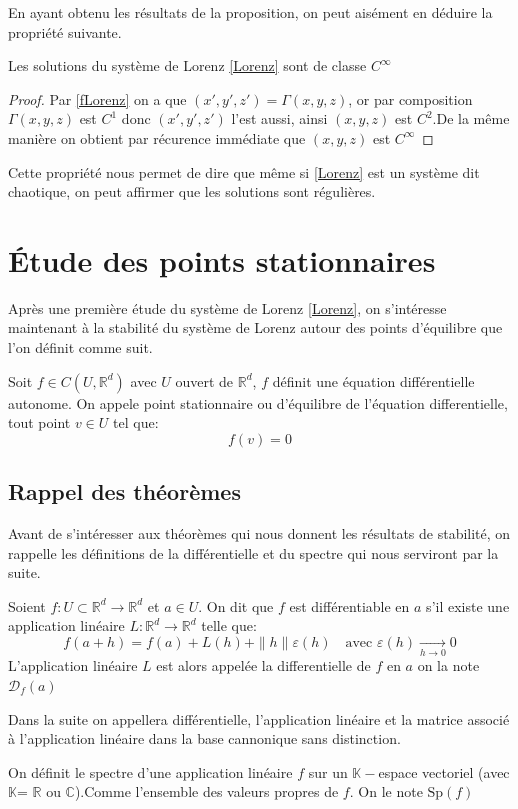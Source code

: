 \documentclass{article}
\newcommand{\R}{\mathbb{R}}
\newtheorem[M , nocut]{prop}{Proposition}[section]
\newtheorem[M , nocut]{definition}{Définition}
\newtheorem[M , nocut]{lemme}{Lemme}
\newtheorem[L , nocut]{thm}{Théoreme}
\newtheorem[M , nocut]{cor}{Corollaire}
\begin{document}
En ayant obtenu les résultats de la proposition, on peut aisément en déduire la propriété suivante.

\begin{cor}
    Les solutions du système de Lorenz \eqref{Lorenz} sont de classe $C^\infty$
\end{cor}

\begin{proof}
    Par \eqref{fLorenz} on a que $(x',y',z') = \Gamma(x,y,z)$, or par composition $\Gamma(x,y,z)$ est $C^1$ donc $(x',y',z')$ l'est aussi, ainsi $(x,y,z)$ est $C^2$.De la même manière on obtient par récurence immédiate que $(x,y,z)$ est $C^\infty$
\end{proof}

Cette propriété nous permet de dire que même si \eqref{Lorenz} est un système dit chaotique, on peut affirmer que les solutions sont régulières.

\newpage
\section{\'Etude des points stationnaires}

Après une première étude du système de Lorenz \eqref{Lorenz}, on s'intéresse maintenant à la stabilité du système de Lorenz autour des points d'équilibre que l'on définit comme suit.

\begin{definition}
    Soit $f\in C(U,\R^d)$ avec $U$ ouvert de $\R^d$, $f$ définit une équation différentielle autonome.
    On appele point stationnaire ou d'équilibre de l'équation differentielle, tout point $v \in U$ tel que:
    $$ f(v) = 0$$ 
\end{definition}

\subsection{Rappel des théorèmes}
\label{sec:Rappel-des-théorèmes}
Avant de s'intéresser aux théorèmes qui nous donnent les résultats de stabilité, on rappelle les définitions de la différentielle et du spectre qui nous serviront par la suite.
\begin{definition}
    Soient $f:U\subset \R^d \to \R^d$ et $a\in U$. On dit que $f$ est différentiable en $a$ s'il existe une application linéaire $L:\R^d\to\R^d$ telle que:
    $$f(a+h) = f(a) + L(h) + \|h\|\varepsilon(h)\quad \text{avec }\varepsilon(h)\xrightarrow[h\to 0]{}0$$ 
    L'application linéaire $L$ est alors appelée la differentielle de $f$ en $a$ on la note $\mathcal{D}_f(a)$
\end{definition}
\begin{example}[Remarque]
    Dans la suite on appellera différentielle, l'application linéaire et la matrice associé à l'application linéaire dans la base cannonique sans distinction.
\end{example}
\begin{definition}
    On définit le spectre d'une application linéaire $f$ sur un $\mathbb{K}-$espace vectoriel (avec $\mathbb{K}$= $\R$ ou $\mathbb{C}$).Comme l'ensemble des valeurs propres de $f$. On le note $\mathrm{Sp}(f)$
\end{definition}
\end{document}
